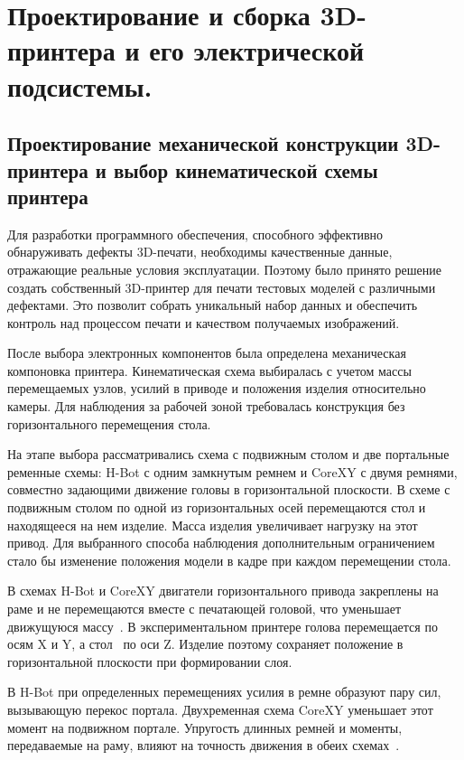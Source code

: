 \chapter{Проектирование и сборка 3D-принтера и его электрической подсистемы.}
\section{Проектирование механической конструкции 3D-принтера и выбор кинематической схемы принтера}

Для разработки программного обеспечения, способного эффективно обнаруживать дефекты 3D-печати, необходимы качественные данные, отражающие реальные условия эксплуатации. Поэтому было принято решение создать собственный 3D-принтер для печати тестовых моделей с различными дефектами. Это позволит собрать уникальный набор данных и обеспечить контроль над процессом печати и качеством получаемых изображений.

После выбора электронных компонентов была определена механическая компоновка принтера. Кинематическая схема выбиралась с учетом массы перемещаемых узлов, усилий в приводе и положения изделия относительно камеры. Для наблюдения за рабочей зоной требовалась конструкция без горизонтального перемещения стола.

На этапе выбора рассматривались схема с подвижным столом и две портальные ременные схемы: H-Bot с одним замкнутым ремнем и CoreXY с двумя ремнями, совместно задающими движение головы в горизонтальной плоскости. В схеме с подвижным столом по одной из горизонтальных осей перемещаются стол и находящееся на нем изделие. Масса изделия увеличивает нагрузку на этот привод. Для выбранного способа наблюдения дополнительным ограничением стало бы изменение положения модели в кадре при каждом перемещении стола.

В схемах H-Bot и CoreXY двигатели горизонтального привода закреплены на раме и не перемещаются вместе с печатающей головой, что уменьшает движущуюся массу~\cite{ida2022parallel}. В экспериментальном принтере голова перемещается по осям X и Y, а стол~\textemdash{} по оси Z. Изделие поэтому сохраняет положение в горизонтальной плоскости при формировании слоя.

В H-Bot при определенных перемещениях усилия в ремне образуют пару сил, вызывающую перекос портала. Двухременная схема CoreXY уменьшает этот момент на подвижном портале. Упругость длинных ремней и моменты, передаваемые на раму, влияют на точность движения в обеих схемах~\cite{ida2022parallel}.

